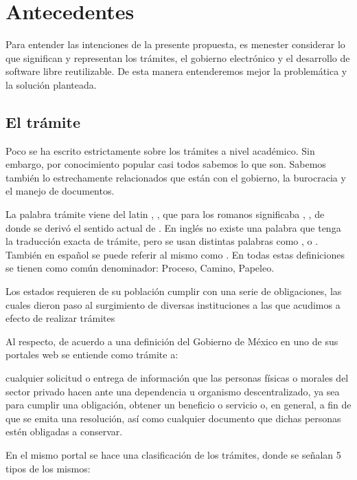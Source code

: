 \section{Antecedentes}

Para entender las intenciones de la presente propuesta, es menester considerar lo que significan y representan los trámites, el gobierno electrónico y el desarrollo de software libre reutilizable. De esta manera entenderemos mejor la problemática y la solución planteada.

\subsection{El trámite}

Poco se ha escrito estrictamente sobre los trámites a nivel académico. Sin embargo, por conocimiento popular casi todos sabemos lo que son. Sabemos también lo estrechamente relacionados que están con el gobierno, la burocracia y el manejo de documentos.

La palabra trámite viene del latin , , que para los romanos significaba , , de donde se derivó el sentido actual de . En inglés no existe una palabra que tenga la traducción exacta de trámite, pero se usan distintas palabras como ,  o . También en español se puede referir al mismo como . En todas estas definiciones se tienen como común denominador: Proceso, Camino, Papeleo.

Los estados requieren de su población cumplir con una serie de obligaciones, las cuales dieron paso al surgimiento de diversas instituciones a las que acudimos a efecto de realizar trámites

Al respecto, de acuerdo a una definición del Gobierno de México en uno de sus portales web se entiende como trámite a:

\begin{displayquote}
    cualquier solicitud o entrega de información que las personas físicas o morales del sector privado hacen ante una dependencia u organismo descentralizado, ya sea para cumplir una obligación, obtener un beneficio o servicio o, en general, a fin de que se emita una resolución, así como cualquier documento que dichas personas estén obligadas a conservar.
\end{displayquote}

En el mismo portal se hace una clasificación de los trámites, donde se señalan 5 tipos de los mismos:

